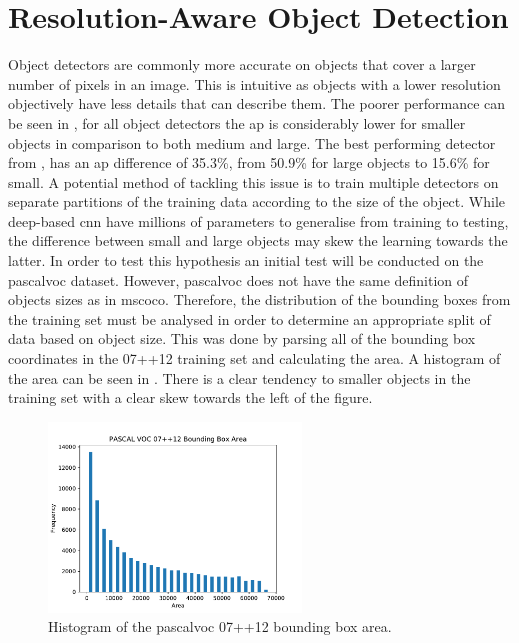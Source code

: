 \section{Resolution-Aware Object Detection}
Object detectors are commonly more accurate on objects that cover a larger number of pixels in an image. This is intuitive as objects with a lower resolution objectively have less details that can describe them. The poorer performance can be seen in , for all object detectors the \gls{ap} is considerably lower for smaller objects in comparison to both medium and large. The best performing detector from \cite{deepres}, has an \gls{ap} difference of 35.3\%, from 50.9\% for large objects to 15.6\% for small. 
A potential method of tackling this issue is to train multiple detectors on separate partitions of the training data according to the size of the object. While deep-based \gls{cnn} have millions of parameters to generalise from training to testing, the difference between small and large objects may skew the learning towards the latter. In order to test this hypothesis an initial test will be conducted on the \gls{pascalvoc} dataset. However, \gls{pascalvoc} does not have the same definition of objects sizes as in \gls{mscoco}. Therefore, the distribution of the bounding boxes from the training set must be analysed in order to determine an appropriate split of data based on object size. This was done by parsing all of the bounding box coordinates in the 07++12 training set and calculating the area. A histogram of the area can be seen in . There is a clear tendency to smaller objects in the training set with a clear skew towards the left of the figure.

\begin{figure}[H]
  \centering
    \includegraphics[width=0.6\textwidth]{Figs/Implementation/0712hist.pdf}
      \caption{Histogram of the \gls{pascalvoc} 07++12 bounding box area.}
    \label{fig:0712hist}
\end{figure}

